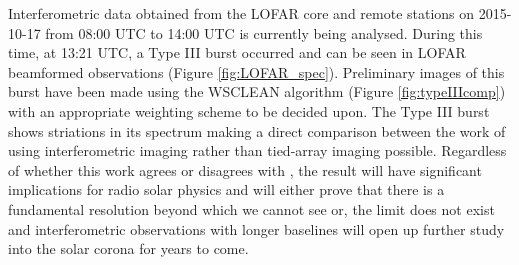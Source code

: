 Interferometric data obtained from the LOFAR core and remote stations on 2015-10-17 from 08:00 UTC to 14:00 UTC is currently being analysed. During this time, at 13:21 UTC, a Type III burst occurred and can be seen in LOFAR beamformed observations (Figure \ref{fig:LOFAR_spec}). Preliminary images of this burst have been made using the WSCLEAN algorithm (Figure \ref{fig:typeIIIcomp}) with an appropriate weighting scheme to be decided upon. The Type III burst shows striations in its spectrum making a direct comparison between the work of \cite{Kontar2017} using interferometric imaging rather than tied-array imaging possible. Regardless of whether this work agrees or disagrees with \cite{Kontar2017}, the result will have significant implications for radio solar physics and will either prove that there is a fundamental resolution beyond which we cannot see or, the limit does not exist and interferometric observations with longer baselines will open up further study into the solar corona for years to come. %







